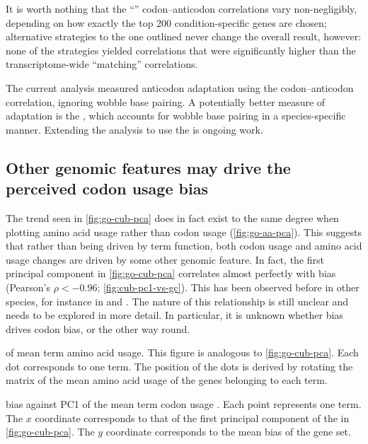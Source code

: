 It is worth nothing that the “” codon--anticodon correlations vary
non-negligibly, depending on how exactly the top \num{200} condition-specific
genes are chosen; alternative strategies to the one outlined never change the
overall result, however: none of the strategies yielded correlations that were
significantly higher than the transcriptome-wide “matching” correlations.

The current analysis measured \trna anticodon adaptation using the
codon--anticodon correlation, ignoring wobble base pairing. A potentially better
measure of \trna adaptation is the \tai, which accounts for wobble base pairing
in a species-specific manner. Extending the analysis to use the \tai is ongoing
work.

\subsection{Other genomic features may drive the perceived codon usage bias}

The trend seen in \cref{fig:go-cub-pca} does in fact exist to the same degree
when plotting amino acid usage rather than codon usage (\cref{fig:go-aa-pca}).
This suggests that rather than being driven by \go term function, both codon
usage and amino acid usage changes are driven by some other genomic feature. In
fact, the first principal component in \cref{fig:go-cub-pca} correlates almost
perfectly with \gc bias (Pearson’s \(\rho < -0.96\); \cref{fig:cub-pc1-vs-gc}).
This has been observed before in other species, for instance in 
and  \citep{Duret:2002}. The nature of this relationship is still
unclear and needs to be explored in more detail. In particular, it is unknown
whether \gc bias drives codon bias, or the other way round.

    {\pca of mean \go term amino acid usage.}
    {This figure is analogous to \cref{fig:go-cub-pca}. Each dot corresponds to
    one \go term. The position of the dots is derived by rotating the matrix of
    the mean amino acid usage of the genes belonging to each \go term.}

    {\gc bias against PC1 of the mean \go term codon usage \pca.}
    {Each point represents one \go term. The \(x\) coordinate corresponds to
    that of the first principal component of the \pca in \cref{fig:go-cub-pca}.
    The \(y\) coordinate corresponds to the mean \gc bias of the \go gene set.}

